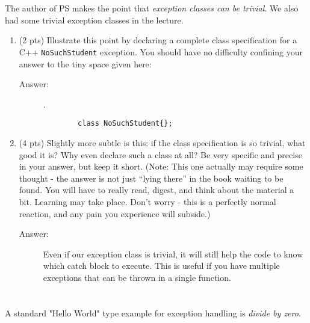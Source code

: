 \documentclass[11pt]{article}
\begin{document}
\section{}
\label{sec:org1d22d10}

The author of PS makes the point that \emph{exception classes can be trivial}. We
also had some trivial exception classes in the lecture.

\begin{enumerate}
\item (2 pts) Illustrate this point by declaring a complete class
specification for a C++ \texttt{NoSuchStudent} exception. You should have no
difficulty confining your answer to the tiny space given here:

\begin{description}
    \item[Answer:] .\\
    \begin{verbatim}
        class NoSuchStudent{};
    \end{verbatim}
\end{description}

\item (4 pts) Slightly more subtle is this: if the class specification is
so trivial, what good it is? Why even declare such a class at all? Be
very specific and precise in your answer, but keep it short. (Note:
This one actually may require some thought - the answer is not just
“lying there” in the book waiting to be found. You will have to
really read, digest, and think about the material a bit. Learning may
take place. Don't worry - this is a perfectly normal reaction, and
any pain you experience will subside.)

\begin{description}
    \item[Answer:] Even if our exception class is trivial, it will still help the code to know which catch block to execute. This is useful if you have multiple exceptions that can be thrown in a single function.
\end{description}

\end{enumerate}

\section{}
\label{sec:org7b92338}

A standard "Hello World" type example for exception handling is \emph{divide by
zero}.
\end{document}
